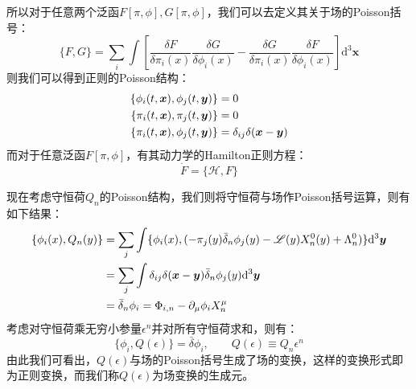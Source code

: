 所以对于任意两个泛函$F[\pi,\phi],G[\pi,\phi]$，我们可以去定义其关于场的Poisson括号：
\begin{equation}
	\{F,G\}=\sum_i\int\left[\frac{\delta F}{\delta\pi_i(x)}\frac{\delta G}{\delta\phi_{i}(x)}-\frac{\delta G}{\delta\pi_i(x)}\frac{\delta F}{\delta\phi_{i}(x)}\right]\mathrm{d}^3\boldsymbol{x}
\end{equation}
则我们可以得到正则的Poisson结构：
\begin{align}
	\{\phi_i(t,\boldsymbol{x}),\phi_j(t,\boldsymbol{y})\}&=0\notag\\
	\{\pi_i(t,\boldsymbol{x}),\pi_j(t,\boldsymbol{y})\}&=0\notag\\
	\{\pi_i(t,\boldsymbol{x}),\phi_j(t,\boldsymbol{y})\}&=\delta_{ij}\delta(\boldsymbol{x}-\boldsymbol{y})
\end{align}
而对于任意泛函$F[\pi,\phi]$，有其动力学的Hamilton正则方程：
\begin{equation}
	\dot{F}=\{\mathcal{H},F\}
\end{equation}

现在考虑守恒荷$Q_n$的Poisson结构，我们则将守恒荷与场作Poisson括号运算，则有如下结果：
\begin{align}
	\{\phi_{i}(x),Q_n(y)\}&=\sum_j\int\{\phi_i(x),(-\pi_j(y)\bar{\delta}_n\phi_j(y)-\mathscr{L}(y)X^0_n(y)+\Lambda^0_n)\}\mathrm{d}^3\boldsymbol{y}\notag\\
	&=\sum_j\int\delta_{ij}\delta(\boldsymbol{x}-\boldsymbol{y})\bar{\delta}_n\phi_j(y)\mathrm{d}^3\boldsymbol{y}\notag\\
	&=\bar{\delta}_n\phi_i=\Phi_{i,n}-\partial_\mu\phi_i X_n^\mu
\end{align}
考虑对守恒荷乘无穷小参量$\epsilon^n$并对所有守恒荷求和，则有：
\begin{equation}
	\{\phi_{i},Q(\epsilon)\}=\bar{\delta}\phi_{i},\qquad Q(\epsilon)\equiv Q_n\epsilon^n
\end{equation}
由此我们可看出，$Q(\epsilon)$与场的Poisson括号生成了场的变换，这样的变换形式即为正则变换，而我们称$Q(\epsilon)$为场变换的生成元。

